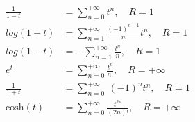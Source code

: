 %
%
\begin{align*}
\frac{1}{1 - t} & =  \sum_{n=0}^{+\infty} t^n, \quad R = 1\\ 
		log(1 + t)& =  \sum_{n=1}^{+\infty} \frac{(-1)^{n-1}}{n} t^n ,\quad R = 1 \\
		log(1 - t) & =  -\sum_{n=1}^{+\infty} \frac{t^n}{ n} ,\quad R = 1 \\
		e^t & =  \sum_{n=0}^{+\infty} \frac{t^n}{n!} ,\quad R = +\infty \\ 
		\frac{1}{1 + t} & = \sum_{n=0}^{+\infty}~(-1)^n t^n,\quad R = 1  \\
		\text{cosh}(t) & =\sum_{n=0}^{+\infty} \frac{t^{2n}}{(2n)!} ,\quad R = +\infty~  \\
\end{align*}
%
%
